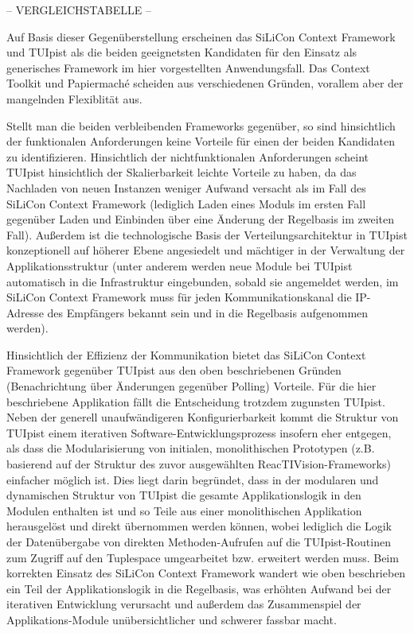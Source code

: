 -- VERGLEICHSTABELLE --

Auf Basis dieser Gegenüberstellung erscheinen das SiLiCon Context Framework und TUIpist als die beiden geeignetsten Kandidaten für den Einsatz als generisches Framework im hier vorgestellten Anwendungsfall. Das Context Toolkit und Papiermaché scheiden aus verschiedenen Gründen, vorallem aber der mangelnden Flexiblität aus.

Stellt man die beiden verbleibenden Frameworks gegenüber, so sind hinsichtlich der funktionalen Anforderungen keine Vorteile für einen der beiden Kandidaten zu identifizieren. Hinsichtlich der nichtfunktionalen Anforderungen scheint TUIpist hinsichtlich der Skalierbarkeit leichte Vorteile zu haben, da das Nachladen von neuen Instanzen weniger Aufwand versacht als im Fall des SiLiCon Context Framework (lediglich Laden eines Moduls im ersten Fall gegenüber Laden und Einbinden über eine Änderung der Regelbasis im zweiten Fall). Außerdem ist die technologische Basis der Verteilungsarchitektur in TUIpist konzeptionell auf höherer Ebene angesiedelt und mächtiger in der Verwaltung der Applikationsstruktur (unter anderem werden neue Module bei TUIpist automatisch in die Infrastruktur eingebunden, sobald sie angemeldet werden, im SiLiCon Context Framework muss für jeden Kommunikationskanal die IP-Adresse des Empfängers bekannt sein und in die Regelbasis aufgenommen werden). 

Hinsichtlich der Effizienz der Kommunikation bietet das SiLiCon Context Framework gegenüber TUIpist aus den oben beschriebenen Gründen (Benachrichtung über Änderungen gegenüber Polling) Vorteile. Für die hier beschriebene Applikation fällt die Entscheidung trotzdem zugunsten TUIpist. Neben der generell unaufwändigeren Konfigurierbarkeit kommt die Struktur von TUIpist einem iterativen Software-Entwicklungsprozess insofern eher entgegen, als dass die Modularisierung von initialen, monolithischen Prototypen (z.B. basierend auf der Struktur des zuvor ausgewählten ReacTIVision-Frameworks) einfacher möglich ist. Dies liegt darin begründet, dass in der modularen und dynamischen Struktur von TUIpist die gesamte Applikationslogik in den Modulen enthalten ist und so Teile aus einer monolithischen Applikation herausgelöst und direkt übernommen werden können, wobei lediglich die Logik der Datenübergabe von direkten Methoden-Aufrufen auf die TUIpist-Routinen zum Zugriff auf den Tuplespace umgearbeitet bzw. erweitert werden muss. Beim korrekten Einsatz des SiLiCon Context Framework wandert wie oben beschrieben ein Teil der Applikationslogik in die Regelbasis, was erhöhten Aufwand bei der iterativen Entwicklung verursacht und außerdem das Zusammenspiel der Applikations-Module unübersichtlicher und schwerer fassbar macht.

